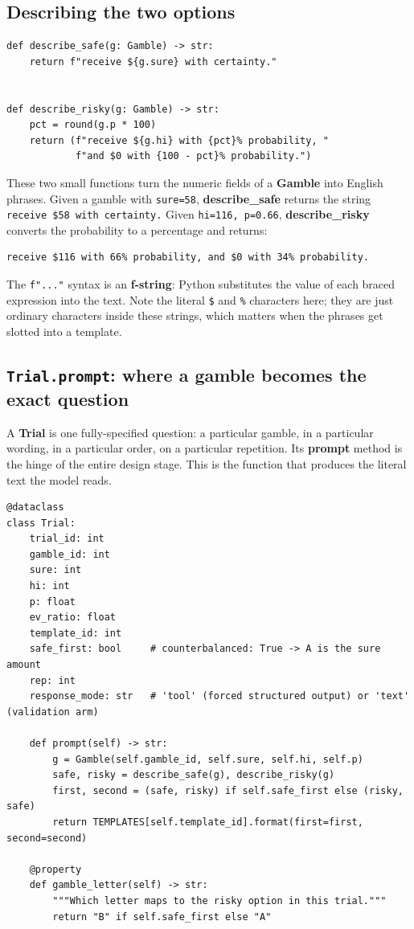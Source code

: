 \documentclass[11pt]{article}
\newcommand{\term}[1]{\textbf{\color{mossdk}#1}}
\newcommand{\file}[1]{\textbf{\ttfamily #1}}
\begin{document}
\subsection{Describing the two options}

\begin{lstlisting}[style=py,firstnumber=106]
def describe_safe(g: Gamble) -> str:
    return f"receive ${g.sure} with certainty."


def describe_risky(g: Gamble) -> str:
    pct = round(g.p * 100)
    return (f"receive ${g.hi} with {pct}% probability, "
            f"and $0 with {100 - pct}% probability.")
\end{lstlisting}

These two small functions turn the numeric fields of a \file{Gamble} into English phrases. Given a
gamble with \verb|sure=58|, \file{describe\_safe} returns the string \verb|receive $58 with certainty.|
Given \verb|hi=116, p=0.66|, \file{describe\_risky} converts the probability to a percentage and
returns:

\begin{lstlisting}[style=sh]
receive $116 with 66% probability, and $0 with 34% probability.
\end{lstlisting}

The \verb|f"..."| syntax is an \term{f-string}: Python substitutes the value of each braced expression
into the text. Note the literal \verb|$| and \verb|%| characters here; they are just ordinary
characters inside these strings, which matters when the phrases get slotted into a template.

\subsection{\texttt{Trial.prompt}: where a gamble becomes the exact question}

A \file{Trial} is one fully-specified question: a particular gamble, in a particular wording, in a
particular order, on a particular repetition. Its \file{prompt} method is the hinge of the entire
design stage. This is the function that produces the literal text the model reads.

\begin{lstlisting}[style=py,firstnumber=120]
@dataclass
class Trial:
    trial_id: int
    gamble_id: int
    sure: int
    hi: int
    p: float
    ev_ratio: float
    template_id: int
    safe_first: bool     # counterbalanced: True -> A is the sure amount
    rep: int
    response_mode: str   # 'tool' (forced structured output) or 'text' (validation arm)

    def prompt(self) -> str:
        g = Gamble(self.gamble_id, self.sure, self.hi, self.p)
        safe, risky = describe_safe(g), describe_risky(g)
        first, second = (safe, risky) if self.safe_first else (risky, safe)
        return TEMPLATES[self.template_id].format(first=first, second=second)

    @property
    def gamble_letter(self) -> str:
        """Which letter maps to the risky option in this trial."""
        return "B" if self.safe_first else "A"
\end{lstlisting}
\end{document}
